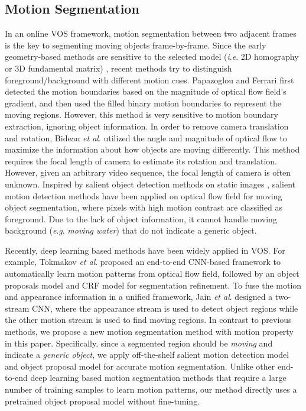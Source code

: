 \documentclass[journal]{IEEEtran}
\newcommand{\etal}{\textit{et al}. }
\newcommand{\ie}{\textit{i}.\textit{e}. }
\newcommand{\eg}{\textit{e}.\textit{g}. }
\begin{document}
\subsection{Motion Segmentation}
In an online VOS framework, motion segmentation between two adjacent frames is the key to segmenting moving objects frame-by-frame. 
Since the early geometry-based methods are sensitive to the selected model (\ie 2D homography or 3D fundamental matrix) \cite{Book2003_Hartley},
recent methods try to distinguish foreground/background with different motion cues.
Papazoglou and Ferrari \cite{ICCV2013_Papazoglou} first detected the motion boundaries based on the magnitude of optical flow field's gradient, 
and then used the filled binary motion boundaries to represent the moving regions.
However, this method is very sensitive to motion boundary extraction, ignoring object information.
In order to remove camera translation and rotation,
Bideau \etal \cite{ECCV2016_Bideau} utilized the angle and magnitude of optical flow to maximize the information about how objects are moving differently.
This method requires the focal length of camera to estimate its rotation and translation. However, given an arbitrary video sequence, the focal length of camera is often unknown.
Inspired by salient object detection methods on static images \cite{TPAMI2011_Cheng,ICCV2015_Zhang,CVPR2017_Hou,Info2018_Sun}, 
salient motion detection methods \cite{CVPR2016_Perazzi,TIP2013_Li} have been applied on optical flow field for moving object segmentation, where pixels with high motion contrast are classified as foreground. 
Due to the lack of object information, it cannot handle moving background (\eg \emph{moving water}) that do not indicate a generic object.

Recently, deep learning based methods have been widely applied in VOS. For example, Tokmakov \etal \cite{CVPR2017_Tokmakov} proposed an end-to-end CNN-based framework to automatically learn motion patterns from optical flow field, followed by an object proposals model and CRF model for segmentation refinement.
To fuse the motion and appearance information in a unified framework, Jain \etal \cite{CVPR2017_Jain} designed a two-stream CNN, where the appearance stream is used to detect object regions while the other motion stream is used to find moving regions.
In contrast to previous methods, we propose a new motion segmentation method with motion property in this paper. 
Specifically, since a segmented region should be \emph{moving} and indicate a \emph{generic object}, we apply off-the-shelf salient motion detection model \cite{ICCV2015_Zhang} and object proposal model \cite{ICCV2017_He} for accurate motion segmentation. Unlike other end-to-end deep learning based motion segmentation methods \cite{CVPR2017_Tokmakov, CVPR2017_Jain} that require a large number of training samples to learn motion patterns, our method directly uses a pretrained object proposal model without fine-tuning. 
\end{document}
